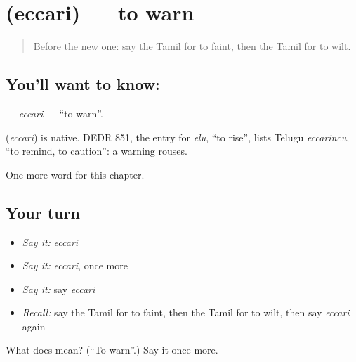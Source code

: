 \section[\texorpdfstring{\ta{எச்சரி} (eccari)}{எச்சரி (eccari)}]{ (eccari) — to warn}

\label{lesson:TA-C231-eccari}



\begin{quote}
Before the new one: say the Tamil for to faint, then the Tamil for to wilt.
\end{quote}

\subsection*{You'll want to know: }
\textbf{} — \emph{eccari} — \textquotedblleft{}to warn\textquotedblright{}.

\begin{cousinweb}
\textbf{} (\emph{eccari}) is native. DEDR 851, the entry for \emph{eḻu}, \textquotedblleft{}to rise\textquotedblright{}, lists Telugu \emph{eccarincu}, \textquotedblleft{}to remind, to caution\textquotedblright{}: a warning rouses.
\end{cousinweb}

\begin{grammarlens}[title={What you've built}]
One more word for this chapter.
\end{grammarlens}

\subsection*{Your turn}
\begin{itemize}
\raggedright
  \item \emph{Say it:} \emph{eccari}
  \item \emph{Say it:} \emph{eccari}, once more
  \item \emph{Say it:} say \emph{eccari}
  \item \emph{Recall:} say the Tamil for to faint, then the Tamil for to wilt, then say \emph{eccari} again
\end{itemize}

\begin{tcolorbox}[breakable,colback=teal!4,colframe=teal!35!black,title={Before you move on}]
What does  mean? (\textquotedblleft{}To warn\textquotedblright{}.) Say it once more.
\end{tcolorbox}
